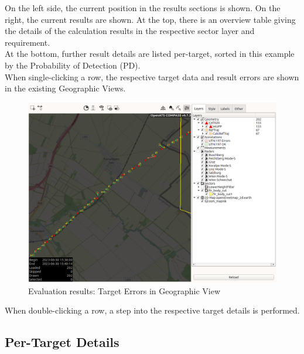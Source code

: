 On the left side, the current position in the results sections is shown. On the right, the current results are shown. At the top, there is an overview table giving the details of the calculation results in the respective sector layer and requirement. \\

At the bottom, further result details are listed per-target, sorted in this example by the Probability of Detection (PD). \\

When single-clicking a row, the respective target data and result errors are shown in the existing Geographic Views.

\begin{figure}[H]
  \hspace*{-2.5cm}
    \includegraphics[width=18cm,frame]{figures/eval_results_single_geoview.png}
  \caption{Evaluation results: Target Errors in Geographic View}
\end{figure}

When double-clicking a row, a step into the respective target details is performed.

\subsection{Per-Target Details}

